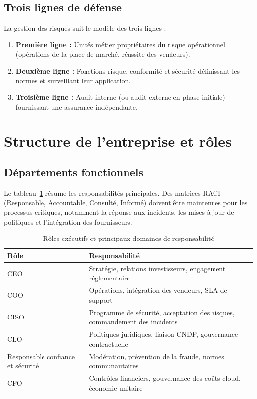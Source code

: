 
\subsection{Trois lignes de défense}

La gestion des risques suit le modèle des trois lignes \parencite{iia2017three} :
\begin{enumerate}
  \item \textbf{Première ligne :} Unités métier propriétaires du risque opérationnel (opérations de la place de marché, réussite des vendeurs).
  \item \textbf{Deuxième ligne :} Fonctions risque, conformité et sécurité définissant les normes et surveillant leur application.
  \item \textbf{Troisième ligne :} Audit interne (ou audit externe en phase initiale) fournissant une assurance indépendante.
\end{enumerate}

\section{Structure de l'entreprise et rôles}

\subsection{Départements fonctionnels}

Le tableau~\ref{tab:roles} résume les responsabilités principales. Des matrices RACI (Responsable, Accountable, Consulté, Informé) doivent être maintenues pour les processus critiques, notamment la réponse aux incidents, les mises à jour de politiques et l'intégration des fournisseurs.

\begin{table}[H]
  \centering
  \caption{Rôles exécutifs et principaux domaines de responsabilité}
  \label{tab:roles}
  \begin{tabularx}{\textwidth}{@{}lX@{}}
    \toprule
    \textbf{Rôle} & \textbf{Responsabilité} \\
    \midrule
    CEO & Stratégie, relations investisseurs, engagement réglementaire \\
    COO & Opérations, intégration des vendeurs, SLA de support \\
    CISO & Programme de sécurité, acceptation des risques, commandement des incidents \\
    CLO & Politiques juridiques, liaison CNDP, gouvernance contractuelle \\
    Responsable confiance et sécurité & Modération, prévention de la fraude, normes communautaires \\
    CFO & Contrôles financiers, gouvernance des coûts cloud, économie unitaire \\
    \bottomrule
  \end{tabularx}
\end{table}

